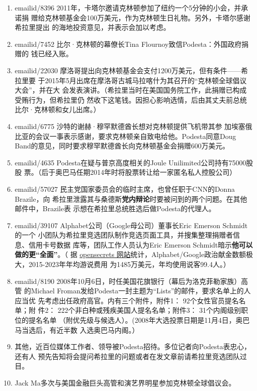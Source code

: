 \begin{enumerate}
\item emailid/8396 2011年，卡塔尔邀请克林顿参加了纽约一个5分钟的小会，并承诺捐
  赠给克林顿基金会100万美元，作为克林顿生日礼物。另外，卡塔尔感谢希拉里提出
  的海地投资意见，并表示会加以考虑。

\item emailid/7452 比尔·克林顿的幕僚长Tina Flournoy致信Podesta：外国政府捐赠的
  钱已经入账。

\item emailid/22030 摩洛哥提出向克林顿基金会支付1200万美元，但有条件——希拉里要
  于2015年5月出席在摩洛哥古城马拉喀什为其召开的“克林顿全球倡议大会”，并在大
  会发表演讲。（希拉里当时在美国国务院工作，此捐赠已构成受贿行为，但希拉里仍
  然收下这笔钱。因担心影响选情，后由其丈夫前总统比尔·克林顿和女儿出席。）

\item emailid/6775 沙特的谢赫·穆罕默德酋长想对克林顿提供飞机带其参
  加埃塞俄比亚的会议一事表示感谢，要求克林顿亲自致电给他。Podesta同意Doug
  Band的意见，同时要求穆罕默德酋长向克林顿基金会捐赠600万美元。

\item emailid/4635 Podesta在疑与普京高度相关的Joule Unilimited公司持有75000股股
  票。（后于奥巴马任期2014年时将股票转让给一家匿名私人控股公司）

\item emailid/57027 民主党国家委员会的临时主席，也曾任职于CNN的Donna Brazile，向
  希拉里泄露其与桑德斯\textbf{党内辩论}时要被问到的两个问题。在其他邮件中，Brazile表
  示想在希拉里总统胜选后做Podesta的代理人。

\item emailid/39107 Alphabet公司（Google母公司）董事长Eric Emerson Schmidt的一个
  小团队为希拉里竞选团队制作竞选页面工具，并搜集整理捐赠者信息、信用卡号数据
  库等，团队工作人员认为Eric Emerson Schmidt暗示\textbf{他可以做的更“全面”}。（
  据
  \href{https://www.opensecrets.org/federal-lobbying/clients/summary?cycle=2019&id=D000067823}{opensecrets
    网站}统计，Alphabet/Google政治献金数额极大，2015-2023年年均游说费用
  为1485万美元，年均使用说客99.4人。）

\item emailid/8190 2008年10月6日，时任美国花旗银行（幕后为洛克菲勒家族）高管
  的Michael Froman发给Podesta一封主题为“Lists”的邮件，要求名单上的人应当优
  先考虑出任政府高官。内有三个附件，附件1： 92个女性官员提名名单；附
  件2： 222个非白种或残疾美国人提名名单；附件3： 31个内阁级别职位的提名名单
  （附优先级与候选人）。(2008年大选投票日期是11月4日，奥巴马当选后，有近半数
  入选奥巴马内阁。）

\item 其他，近百位媒体工作者、领导被Podesta招待。多位记者向Podesta表忠心，还有人
  预先告知将会提问希拉里的问题或者在发文章前请希拉里竞选团队过目。

\item Jack Ma多次与美国金融巨头高管和演艺界明星参加克林顿全球倡议会。
\end{enumerate}



